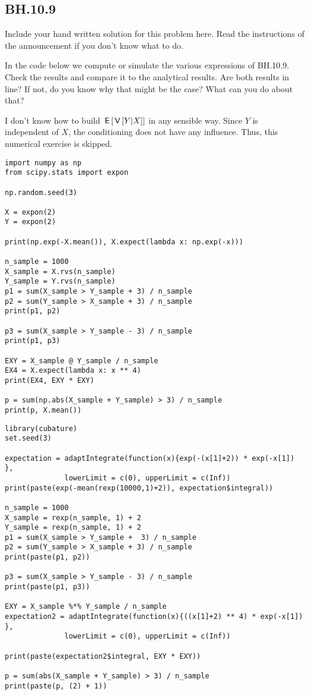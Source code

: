 

\subsection{BH.10.9}


\begin{exercise}
Include your hand written solution for this problem here. Read the instructions of the announcement if you don't know what to do.
\end{exercise}


\begin{exercise}
In the code below we compute or simulate the various expressions of BH.10.9. Check the results and compare it to the analytical results. Are both results in line? If not, do you know why that might be the case? What can you do about that?

I don't know how to build $\,\mathsf{E}\left[\,\mathsf{V}\left[Y|X\right]\right]$ in any sensible way. Since $Y$ is independent of $X$, the conditioning does not have any influence. Thus, this numerical exercise is skipped.
\end{exercise}

\begin{verbatim}
import numpy as np
from scipy.stats import expon

np.random.seed(3)

X = expon(2)
Y = expon(2)

print(np.exp(-X.mean()), X.expect(lambda x: np.exp(-x)))

n_sample = 1000
X_sample = X.rvs(n_sample)
Y_sample = Y.rvs(n_sample)
p1 = sum(X_sample > Y_sample + 3) / n_sample
p2 = sum(Y_sample > X_sample + 3) / n_sample
print(p1, p2)

p3 = sum(X_sample > Y_sample - 3) / n_sample
print(p1, p3)

EXY = X_sample @ Y_sample / n_sample
EX4 = X.expect(lambda x: x ** 4)
print(EX4, EXY * EXY)

p = sum(np.abs(X_sample + Y_sample) > 3) / n_sample
print(p, X.mean())
\end{verbatim}

\begin{verbatim}
library(cubature)
set.seed(3)

expectation = adaptIntegrate(function(x){exp(-(x[1]+2)) * exp(-x[1]) },
              lowerLimit = c(0), upperLimit = c(Inf))
print(paste(exp(-mean(rexp(10000,1)+2)), expectation$integral))

n_sample = 1000
X_sample = rexp(n_sample, 1) + 2
Y_sample = rexp(n_sample, 1) + 2
p1 = sum(X_sample > Y_sample +  3) / n_sample
p2 = sum(Y_sample > X_sample + 3) / n_sample
print(paste(p1, p2))

p3 = sum(X_sample > Y_sample - 3) / n_sample
print(paste(p1, p3))

EXY = X_sample %*% Y_sample / n_sample
expectation2 = adaptIntegrate(function(x){((x[1]+2) ** 4) * exp(-x[1]) },
              lowerLimit = c(0), upperLimit = c(Inf))

print(paste(expectation2$integral, EXY * EXY))

p = sum(abs(X_sample + Y_sample) > 3) / n_sample
print(paste(p, (2) + 1))
\end{verbatim}


